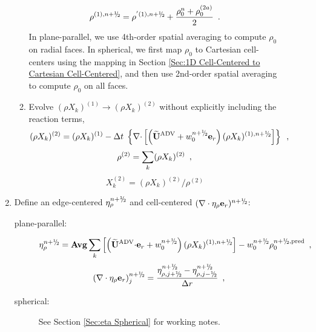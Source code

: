 \begin{description}
\begin{enumerate}
\begin{enumerate}
\begin{equation}
\rho^{(1),\nph} = \rho^{'(1),\nph} + \frac{\rho_0^n + \rho_0^{(2a)}}{2}\enskip .
\end{equation}
  In plane-parallel, we use 4th-order spatial averaging to compute $\rho_0$ on 
  radial faces.  In spherical, we first map $\rho_0$ to Cartesian cell-centers 
  using the mapping in Section \ref{Sec:1D Cell-Centered to Cartesian Cell-Centered}, 
  and then use 2nd-order spatial averaging to compute $\rho_0$ on all faces.

    \item Evolve $(\rho X_k)^{(1)} \rightarrow (\rho X_k)^{(2)}$
      without explicitly including the reaction terms,
\begin{equation}
(\rho X_k)^{(2)} = (\rho X_k)^{(1)} 
- \dt \; \left\{ \nablab \cdotb \left[\left(\uadvtwo+w_0^{\nph} \er\right)  
(\rho X_k)^{(1),\nph} \right] \right\}  \enskip ,
\end{equation}
\begin{equation}
\rho^{(2)} = \sum_k (\rho X_k)^{(2)} \enskip ,
\end{equation}
\begin{equation}
X_k^{(2)} = (\rho X_k)^{(2)} / \rho^{(2)}
\end{equation}

\end{enumerate}

\item Define an edge-centered $\etarho^{\nph}$ and cell-centered 
$(\nabla\cdot\etarho\er)^{\nph}$:

\begin{description}

\item[plane-parallel:]

\begin{equation}
 \etarho^{\nph} = {\rm {\bf Avg}} \sum_k \left [\left(\uadvtwo \cdotb \er + w_0^{\nph}\right) (\rho X_k)^{(1),\nph} \right] - w_0^{\nph} \rho_0^{\nph,{\rm pred}} \enskip ,
\end{equation}
\begin{equation}
(\nabla\cdot\etarho\er)_j^{\nph} = \frac{\eta_{\rho,j+\myhalf}^{\nph} - \eta_{\rho,j-\myhalf}^{\nph}}{\Delta r} \enskip , \\
\end{equation}

\item[spherical:] See Section \ref{Sec:eta Spherical} for working notes.

\end{description}


\end{enumerate}
\end{description}
